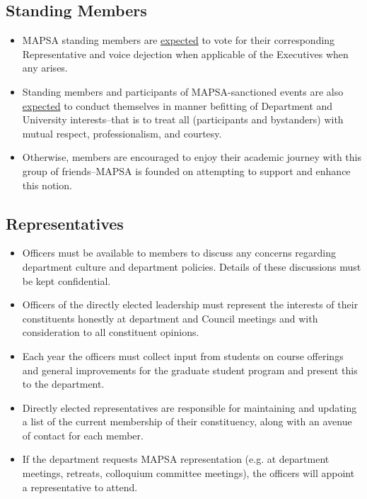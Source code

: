 \documentclass[11pt]{article}
\begin{document}
	\subsection{Standing Members}
	\begin{itemize}
		\item MAPSA standing members are \underline{expected} to vote for their corresponding Representative and voice dejection when applicable of the Executives when any arises. 
		\item Standing members and participants of MAPSA-sanctioned events are also \underline{expected} to conduct themselves in manner befitting of Department and University interests--that is to treat all (participants and bystanders) with mutual respect, professionalism, and courtesy. 
		\item Otherwise, members are encouraged to enjoy their academic journey with this group of friends--MAPSA is founded on attempting to support and enhance this notion.
	\end{itemize}
	\subsection{Representatives}
	\begin{itemize}
		\item Officers must be available to members to discuss any concerns regarding department culture and department policies. Details of these discussions must be kept confidential.
		\item Officers of the directly elected leadership must represent the interests of their constituents honestly at department and Council meetings and with consideration to all constituent opinions.
		\item Each year the officers must collect input from students on course offerings and general improvements for the graduate student program and present this to the department.
		\item Directly elected representatives are responsible for maintaining and updating a list of the current membership of their constituency, along with an avenue of contact for each member.
		\item If the department requests MAPSA representation (e.g. at department meetings, retreats, colloquium committee meetings), the officers will appoint a representative to attend.
	\end{itemize}
\end{document}
